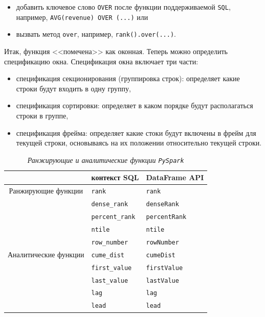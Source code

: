 \documentclass[%
	11pt,
	a4paper,
	utf8,
		]{article}
\begin{document}
\begin{itemize}
	\item добавить ключевое слово \texttt{OVER} после функции поддерживаемой \texttt{SQL}, например, \texttt{AVG(revenue) OVER (...)} или
	
	\item вызвать метод \texttt{over}, например, \texttt{rank().over(...)}.
\end{itemize}

Итак, функция <<помечена>> как оконная. Теперь можно определить спецификацию окна. Спецификация окна включает три части:

\begin{itemize}
	\item спецификация секционирования (группировка строк): определяет какие строки будут входить в одну группу,
	
	\item спецификация сортировки: определяет в каком порядке будут располагаться строки в группе,
	
	\item спецификация фрейма: определяет какие стоки будут включены в фрейм для текущей строки, основываясь на их положении относительно текущей строки.
\end{itemize}

\begin{table}[h]
	\centering
	\caption{\itshape Ранжирующие и аналитические функции \texttt{PySpark}}\label{tab:sql_df_api}
	\begin{tabular}{cll}
		{} & контекст {SQL} & {DataFrame API} \\ \hline\hline
		Ранжирующие функции & \texttt{rank} & \texttt{rank} \\
		\rowcolor[gray]{0.96} {} & \texttt{dense\_rank} & \texttt{denseRank} \\
		{} & \texttt{percent\_rank} & \texttt{percentRank} \\
		\rowcolor[gray]{0.96} {} & \texttt{ntile} & \texttt{ntile} \\
		{} & \texttt{row\_number} & \texttt{rowNumber} \\ \hline
		\rowcolor[gray]{0.96} Аналитические функции & \texttt{cume\_dist} & \texttt{cumeDist} \\
		{} & \texttt{first\_value} & \texttt{firstValue} \\
		\rowcolor[gray]{0.96}{} & \texttt{last\_value} & \texttt{lastValue} \\
		{} & \texttt{lag} & \texttt{lag} \\
		\rowcolor[gray]{0.96} {} & \texttt{lead} & \texttt{lead} \\
	\end{tabular}
\end{table}
\end{document}
